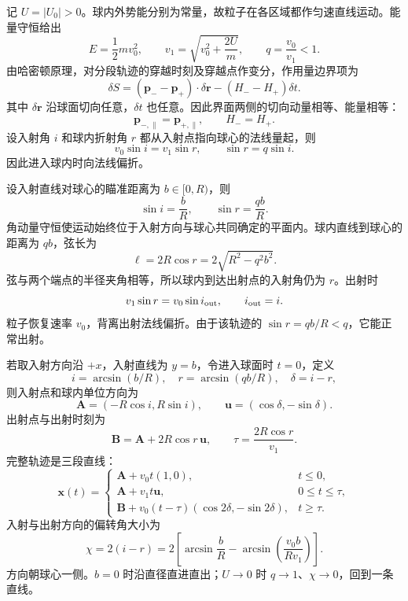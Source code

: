 \documentclass[11pt,a4paper]{ctexart}
\begin{document}
记 $U=|U_0|>0$。球内外势能分别为常量，故粒子在各区域都作匀速直线运动。能量守恒给出
\[
E=\frac12mv_0^2,\qquad
v_1=\sqrt{v_0^2+\frac{2U}{m}},\qquad
q=\frac{v_0}{v_1}<1.
\]
由哈密顿原理，对分段轨迹的穿越时刻及穿越点作变分，作用量边界项为
\[
\delta S=(\bm p_- -\bm p_+)\cdot\delta\bm r
-(H_- -H_+)\delta t.
\]
其中 $\delta\bm r$ 沿球面切向任意，$\delta t$ 也任意。因此界面两侧的切向动量相等、能量相等：
\[
\bm p_{-,\parallel}=\bm p_{+,\parallel},\qquad H_-=H_+.
\]
设入射角 $i$ 和球内折射角 $r$ 都从入射点指向球心的法线量起，则
\[
{v_0\sin i=v_1\sin r},\qquad
{\sin r=q\sin i}.
\]
因此进入球内时向法线偏折。

设入射直线对球心的瞄准距离为 $b\in[0,R)$，则
\[
\sin i=\frac bR,\qquad
\sin r=\frac{qb}{R}.
\]
角动量守恒使运动始终位于入射方向与球心共同确定的平面内。球内直线到球心的距离为 $qb$，弦长为
\[
\ell=2R\cos r=2\sqrt{R^2-q^2b^2}.
\]
弦与两个端点的半径夹角相等，所以球内到达出射点的入射角仍为 $r$。出射时
\[
v_1\sin r=v_0\sin i_{\rm out},
\qquad i_{\rm out}=i.
\]
粒子恢复速率 $v_0$，背离出射法线偏折。由于该轨迹的 $\sin r=qb/R<q$，它能正常出射。

若取入射方向沿 $+x$，入射直线为 $y=b$，令进入球面时 $t=0$，定义
\[
i=\arcsin(b/R),\quad r=\arcsin(qb/R),\quad\delta=i-r,
\]
则入射点和球内单位方向为
\[
\bm A=(-R\cos i,R\sin i),\qquad
\bm u=(\cos\delta,-\sin\delta).
\]
出射点与出射时刻为
\[
\bm B=\bm A+2R\cos r\,\bm u,\qquad
\tau=\frac{2R\cos r}{v_1}.
\]
完整轨迹是三段直线：
\[
{\bm x(t)=\begin{cases}
\bm A+v_0t(1,0),&t\le0,\\
\bm A+v_1t\bm u,&0\le t\le\tau,\\
\bm B+v_0(t-\tau)(\cos2\delta,-\sin2\delta),&t\ge\tau.
\end{cases}}
\]
入射与出射方向的偏转角大小为
\[
{\chi=2(i-r)=2\left[\arcsin\frac bR-
\arcsin\left(\frac{v_0b}{Rv_1}\right)\right]}.
\]
方向朝球心一侧。$b=0$ 时沿直径直进直出；$U\to0$ 时 $q\to1$、$\chi\to0$，回到一条直线。
\end{document}
